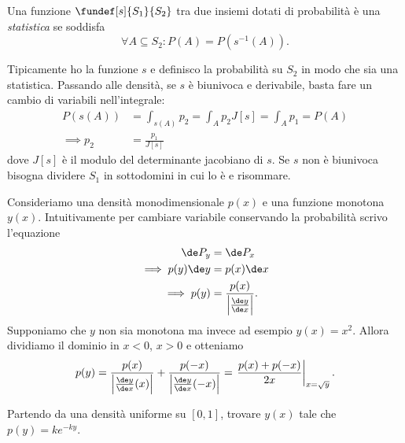 \begin{definition}[Statistica]
	Una funzione $\fundef[s]{S_1}{S_2}$ tra due insiemi dotati di probabilità è una \emph{statistica} se soddisfa
	\begin{equation*}
		\forall A\subseteq S_2 : P(A) = P(s^{-1}(A)).
	\end{equation*}
\end{definition}

Tipicamente ho la funzione $s$ e definisco la probabilità su $S_2$ in modo che sia una statistica.
Passando alle densità, se $s$ è biunivoca e derivabile, basta fare un cambio di variabili nell'integrale:
\begin{align*}
	P(s(A)) &= \int_{s(A)} p_2 = \int_A p_2 J[s] = \int_A p_1 = P(A) \\
	\implies p_2 &= \frac{p_1}{J[s]}
\end{align*}
dove $J[s]$ è il modulo del determinante jacobiano di $s$.
Se $s$ non è biunivoca bisogna dividere $S_1$ in sottodomini in cui lo è e risommare.

\begin{example}
	\label{th:stat1d}
	Consideriamo una densità monodimensionale $p(x)$ e una funzione monotona $y(x)$.
	Intuitivamente per cambiare variabile conservando la probabilità scrivo l'equazione
	\begin{align*}
		\de P_y &= \de P_x \\
		\implies p(y)\de y &= p(x) \de x \\
		\implies p(y) &= \frac{p(x)}{\left|\frac{\de y}{\de x}\right|}.
	\end{align*}
	Supponiamo che $y$ non sia monotona ma invece ad esempio $y(x)=x^2$.
	Allora dividiamo il dominio in $x<0$, $x>0$ e otteniamo
	\begin{equation*}
		p(y) = \frac{p(x)}{\left|\frac{\de y}{\de x}(x)\right|} + \frac{p(-x)}{\left|\frac{\de y}{\de x}(-x)\right|} =
		\left.\frac{p(x)+p(-x)}{2x}\right|_{x=\sqrt y}.
	\end{equation*}
\end{example}

\begin{exercise}
	Partendo da una densità uniforme su $[0,1]$,
	trovare $y(x)$ tale che $p(y) = ke^{-ky}$.
\end{exercise}


